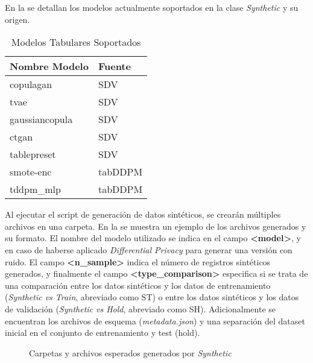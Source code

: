 En la  se detallan los modelos actualmente soportados en la clase \emph{Synthetic} y su origen.

\begin{table}[H]
	\centering
	\caption{Modelos Tabulares Soportados}
	\label{modelos-tab-soportados}
    \begin{tabular}{|l|l|}
        \hline
        \rowcolor[gray]{0.8}
        Nombre Modelo & Fuente \\
        \hline
        copulagan & SDV \cite{kotelnikov_overview_nodate} \\
        \hline
        tvae & SDV \cite{kotelnikov_overview_nodate} \\
        \hline
        gaussiancopula & SDV \cite{kotelnikov_overview_nodate} \\
        \hline
        ctgan & SDV \cite{kotelnikov_overview_nodate} \\
        \hline
        tablepreset & SDV \cite{kotelnikov_overview_nodate} \\
        \hline
        smote-enc & tabDDPM \cite{akim_tabddpm_2023} \\
        \hline
        tddpm\_mlp & tabDDPM \cite{akim_tabddpm_2023} \\
        \hline
      \end{tabular}        
\end{table} 

Al ejecutar el script de generación de datos sintéticos, se crearán múltiples archivos en una carpeta. En la  se muestra un ejemplo de los archivos generados y su formato. El nombre del modelo utilizado se indica en el campo \textbf{<model>}, y en caso de haberse aplicado \emph{Differential Privacy} para generar una versión con ruido. El campo \textbf{<n\_sample>} indica el número de registros sintéticos generados, y finalmente el campo \textbf{<type\_comparison>} especifica si se trata de una comparación entre los datos sintéticos y los datos de entrenamiento (\emph{Synthetic vs Train}, abreviado como ST) o entre los datos sintéticos y los datos de validación (\emph{Synthetic vs Hold}, abreviado como SH). Adicionalmente se encuentran los archivos de esquema (\emph{metadata.json}) y una separación del dataset inicial en el conjunto de entrenamiento y test (hold).
\begin{figure}[H]
	\centering
	
	\caption{Carpetas y archivos esperados generados por \emph{Synthetic}}
	\label{synth-folders}
\end{figure}

